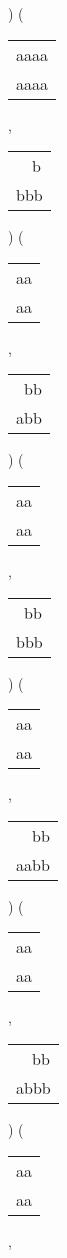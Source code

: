 \begin{description}
\begin{tabular}{|l|}
\hline
\end{tabular} 
) 
 ( 
\begin{tabular}{|l|} \hline
aaaa \\
aaaa \\
\hline
\end{tabular} 
 , 
\begin{tabular}{|l|} \hline
\ \ b \\
bbb \\
\hline
\end{tabular} 
) 
 ( 
\begin{tabular}{|l|} \hline
aa \\
aa \\
\hline
\end{tabular} 
 , 
\begin{tabular}{|l|} \hline
\ bb \\
abb \\
\hline
\end{tabular} 
) 
 ( 
\begin{tabular}{|l|} \hline
aa \\
aa \\
\hline
\end{tabular} 
 , 
\begin{tabular}{|l|} \hline
\ bb \\
bbb \\
\hline
\end{tabular} 
) 
 ( 
\begin{tabular}{|l|} \hline
aa \\
aa \\
\hline
\end{tabular} 
 , 
\begin{tabular}{|l|} \hline
\ \ bb \\
aabb \\
\hline
\end{tabular} 
) 
 ( 
\begin{tabular}{|l|} \hline
aa \\
aa \\
\hline
\end{tabular} 
 , 
\begin{tabular}{|l|} \hline
\ \ bb \\
abbb \\
\hline
\end{tabular} 
) 
 ( 
\begin{tabular}{|l|} \hline
aa \\
aa \\
\hline
\end{tabular} 
 , 
\begin{tabular}{|l|} \hline

\end{tabular}
\end{description}
